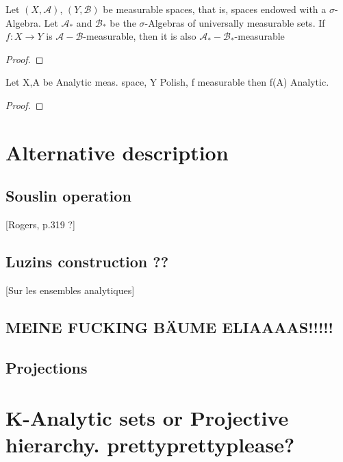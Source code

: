 \documentclass[10pt, a4paper, titlepage]{article}
\numberwithin{equation}{section}
\begin{document}
\begin{theorem}
	Let $(X,\mathcal{A})$,  $\left( Y, \mathcal{B} \right) $ be measurable spaces, that is, spaces endowed with a $\sigma$-Algebra.  
	Let $\mathcal{A}_*$ and $\mathcal{B}_*$ be the $\sigma$-Algebras of universally measurable sets.
	If  $f:X \to Y$ is  $\mathcal{A}- \mathcal{B}$-measurable, then it is also $\mathcal{A}_*-\mathcal{B}_*$-measurable
\end{theorem}
\begin{proof}
	
\end{proof}

\begin{definition}
	
\end{definition}

\begin{theorem}
	Let X,A be Analytic meas. space, Y Polish, f measurable then f(A) Analytic.
\end{theorem}
\begin{proof}
	
\end{proof}



\section{Alternative description}


\subsection{Souslin operation}
[Rogers, p.319 ?]

\subsection{Luzins construction ??}
[Sur les ensembles analytiques]

\subsection{MEINE FUCKING BÄUME ELIAAAAS!!!!!}


 \subsection{Projections}



\section{K-Analytic sets or Projective hierarchy. prettyprettyplease?}































\vspace{\fill}
\printbibliography{}
\end{document}
